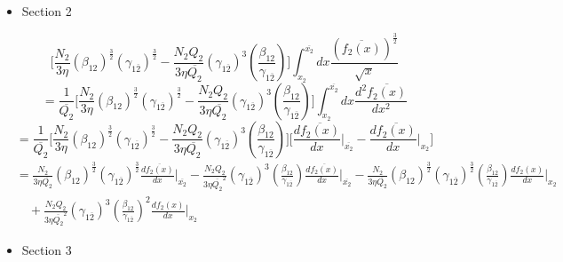 \documentclass[fleqn, 10pt]{article}
\begin{document}
\begin{itemize}
     \item Section 2
 \end{itemize}
 \begin{equation}
     \Biggl[ \frac{N_2}{3 \eta} (\beta_{12})^\frac{3}{2} (\gamma_{1\overline{2}})^\frac{3}{2} - \frac{N_2 Q_2}{3 \eta \overline{Q_{2}}} (\gamma_{1\overline{2}})^3 \left( \frac{\beta_{12}}{\gamma_{1\overline{2}}}\right) \Biggr] \int^{\overline{x_{2}}}_{x_2} dx \frac{(\overline{f_{2}(x)})^\frac{3}{2}}{\sqrt{x}}
     \label{98}
 \end{equation}
 \begin{equation*}
     = \frac{1}{\overline{Q_{2}}} \Biggl[ \frac{N_2}{3 \eta} (\beta_{12})^\frac{3}{2} (\gamma_{1\overline{2}})^\frac{3}{2} - \frac{N_2 Q_2}{3 \eta \overline{Q_{2}}} (\gamma_{1\overline{2}})^3 \left( \frac{\beta_{12}}{\gamma_{1\overline{2}}}\right) \Biggr] \int^{\overline{x_{2}}}_{x_2} dx \frac{d^2\overline{f_{2}(x)}}{dx^2} 
 \end{equation*}
 \begin{equation*}
     = \frac{1}{\overline{Q_{2}}} \Biggl[ \frac{N_2}{3 \eta} (\beta_{12})^\frac{3}{2} (\gamma_{1\overline{2}})^\frac{3}{2} -   \frac{N_2 Q_2}{3 \eta \overline{Q_{2}}} (\gamma_{1\overline{2}})^3 \left( \frac{\beta_{12}}{\gamma_{1\overline{2}}}\right) \Biggr] \biggl[ \frac{d\overline{f_{2}(x)}}{dx} \Bigg|_{\overline{x_{2}}} -   \frac{d\overline{f_{2}(x)}}{dx} \Bigg|_{x_2} \biggr] 
 \end{equation*}
 \begin{equation}
 \begin{split}
     & =   \frac{N_2}{3 \eta \overline{Q_{2}}} (\beta_{12})^\frac{3}{2} (\gamma_{1\overline{2}})^\frac{3}{2} \frac{d\overline{f_{2}(x)}}{dx} \Bigg|_{\overline{x_{2}}} -   \frac{N_2 Q_2}{3 \eta {\overline{Q_{2}}}^2} (\gamma_{1\overline{2}})^3 \left( \frac{\beta_{12}}{\gamma_{1\overline{2}}}\right) \frac{d\overline{f_{2}(x)}}{dx} \Bigg|_{\overline{x_{2}}}  -  \frac{N_2}{3 \eta \overline{Q_{2}}} (\beta_{12})^\frac{3}{2} (\gamma_{1\overline{2}})^\frac{3}{2} \left( \frac{\beta_{12}}{\gamma_{1\overline{2}}}\right) \frac{df_2(x)}{dx} \Bigg|_{x_2} \\ & \quad +   \frac{N_2 Q_2}{3 \eta {\overline{Q_{2}}}^2} (\gamma_{1\overline{2}})^3 \left( \frac{\beta_{12}}{\gamma_{1\overline{2}}}\right)^2 \frac{df_2(x)}{dx} \Bigg|_{x_2}
     \label{99}
     \end{split}
 \end{equation}
 \begin{itemize}
     \item Section 3
 \end{itemize}
\end{document}
